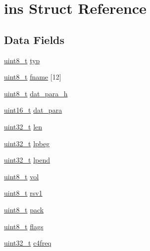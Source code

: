 \hypertarget{structins}{}\section{ins Struct Reference}
\label{structins}
\subsection*{Data Fields}
\begin{DoxyCompactItemize}
\item 
\hyperlink{inttypes_8h_aba7bc1797add20fe3efdf37ced1182c5}{uint8\+\_\+t} \hyperlink{structins_a59e5fac19c5b9fde60f045f1cd44f695}{typ}
\item 
\hyperlink{inttypes_8h_aba7bc1797add20fe3efdf37ced1182c5}{uint8\+\_\+t} \hyperlink{structins_a5f9ce9bcf93dd3b92eeeadc1fe1a63bf}{fname} \mbox{[}12\mbox{]}
\item 
\hyperlink{inttypes_8h_aba7bc1797add20fe3efdf37ced1182c5}{uint8\+\_\+t} \hyperlink{structins_a4d0d131346ce3ba1f85b51b1b4bc0357}{dat\+\_\+para\+\_\+h}
\item 
\hyperlink{inttypes_8h_a273cf69d639a59973b6019625df33e30}{uint16\+\_\+t} \hyperlink{structins_a25418cae7f447c093d72ed50df903e2d}{dat\+\_\+para}
\item 
\hyperlink{inttypes_8h_a435d1572bf3f880d55459d9805097f62}{uint32\+\_\+t} \hyperlink{structins_afe48a7a58cdab2ef0fc1da53e1575e40}{len}
\item 
\hyperlink{inttypes_8h_a435d1572bf3f880d55459d9805097f62}{uint32\+\_\+t} \hyperlink{structins_ad53ff3be292b822c57c44004ad115887}{lpbeg}
\item 
\hyperlink{inttypes_8h_a435d1572bf3f880d55459d9805097f62}{uint32\+\_\+t} \hyperlink{structins_ad3c7eb97b6b14a989950b1ffceade6c0}{lpend}
\item 
\hyperlink{inttypes_8h_aba7bc1797add20fe3efdf37ced1182c5}{uint8\+\_\+t} \hyperlink{structins_ada1b49154d9c1d8050da37526a18335b}{vol}
\item 
\hyperlink{inttypes_8h_aba7bc1797add20fe3efdf37ced1182c5}{uint8\+\_\+t} \hyperlink{structins_aa3e4bfa21fdcadeadd75fb7b3baf224d}{rsv1}
\item 
\hyperlink{inttypes_8h_aba7bc1797add20fe3efdf37ced1182c5}{uint8\+\_\+t} \hyperlink{structins_a7bd27b2f8b9d4b54cef7ce11f112e310}{pack}
\item 
\hyperlink{inttypes_8h_aba7bc1797add20fe3efdf37ced1182c5}{uint8\+\_\+t} \hyperlink{structins_aa092fb0cf5672d626e0c82678c0fde35}{flags}
\item 
\hyperlink{inttypes_8h_a435d1572bf3f880d55459d9805097f62}{uint32\+\_\+t} \hyperlink{structins_ad71d3ef90ec69fab3a86e12aa43f8834}{c4freq}

\end{DoxyCompactItemize}
